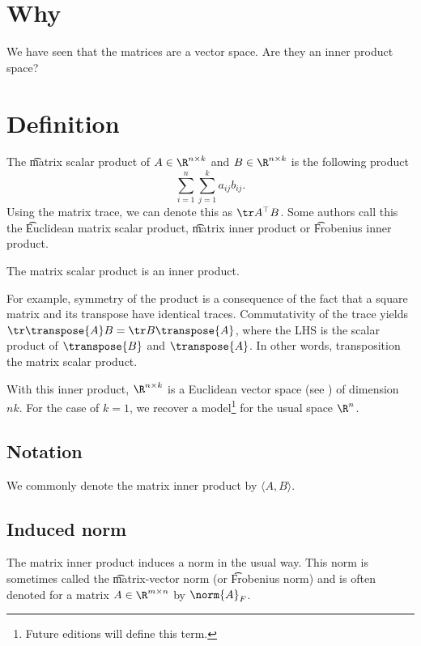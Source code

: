 

\section*{Why}

We have seen that the matrices are a vector space.
Are they an inner product space?

\section*{Definition}

The \t{matrix scalar product} of $A \in \R ^{n \times k}$ and $B \in \R ^{n \times k}$ is the following product
  \[
\sum_{i = 1}^{n} \sum_{j = 1}^{k} a_{ij}b_{ij}.
  \]
Using the matrix trace, we can denote this as $\tr A^\top  B$.
Some authors call this the \t{Euclidean matrix scalar product}, \t{matrix inner product} or \t{Frobenius inner product}.

\begin{proposition}
The matrix scalar product is an inner product.\end{proposition}

For example, symmetry of the product is a consequence of the fact that a square matrix and its transpose have identical traces.
Commutativity of the trace yields $\tr \transpose{A} B = \tr B\transpose{A}$, where the LHS is the scalar product of $\transpose{B}$ and $\transpose{A}$.
In other words, transposition  the matrix scalar product.

With this inner product, $\R ^{n \times k}$ is a Euclidean vector space (see ) of dimension $nk$.
For the case of $k = 1$, we recover a model\footnote{Future editions will define this term.}
for the usual space $\R ^n$.

\subsection*{Notation}

We commonly denote the matrix inner product by $\langle A, B \rangle$.

\subsection*{Induced norm}

The matrix inner product induces a norm in the usual way.
This norm is sometimes called the \t{matrix-vector norm} (or \t{Frobenius norm}) and is often denoted for a matrix $A \in \R ^{m \times  n}$ by $\norm{A}_F$.
